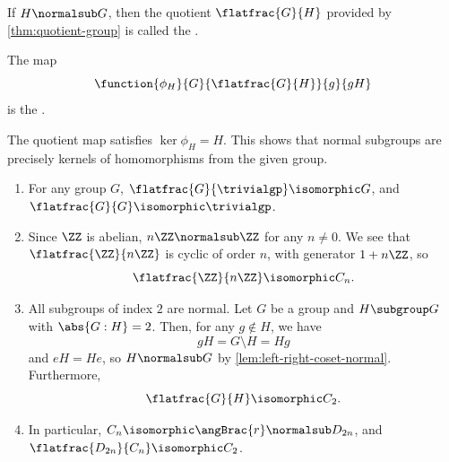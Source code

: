 \begin{definition}
    \label{def:quotient-group-map}
    If \(H \normalsub G\), then the quotient \(\flatfrac{G}{H}\) provided by \autoref{thm:quotient-group} is called the .
    
    The map
    \[
        \function{\phi_{H}}{G}{\flatfrac{G}{H}}{g}{gH}
    \]
    is the .
\end{definition}

\begin{remark}
    The quotient map satisfies \(\ker \phi_{H} = H\). This shows that normal subgroups are precisely kernels of homomorphisms from the given group.
\end{remark}

\begin{examples*}
    \begin{enumerate}
        \item For any group \(G\), \(\flatfrac{G}{\trivialgp} \isomorphic G\), and \(\flatfrac{G}{G} \isomorphic \trivialgp\).
        \item Since \(\ZZ\) is abelian, \(n\ZZ \normalsub \ZZ\) for any \(n \neq 0\). We see that \(\flatfrac{\ZZ}{n \ZZ}\) is cyclic of order \(n\), with generator \(1 + n\ZZ\), so
        \[
            \flatfrac{\ZZ}{n\ZZ} \isomorphic C_n.
        \]
        \item All subgroups of index \(2\) are normal. Let \(G\) be a group and \(H \subgroup G\) with \(\abs{G : H} = 2\). Then, for any \(g \notin H\), we have
        \[
            gH = G \setminus H = Hg
        \]
        and \(eH = He\), so \(H \normalsub G\) by \autoref{lem:left-right-coset-normal}. Furthermore,
        \[
            \flatfrac{G}{H} \isomorphic C_2.
        \]
        \item In particular, \(C_n \isomorphic \angBrac{r} \normalsub D_{2n}\), and \(\flatfrac{D_{2n}}{C_n} \isomorphic C_2\).
    \end{enumerate}
\end{examples*}

